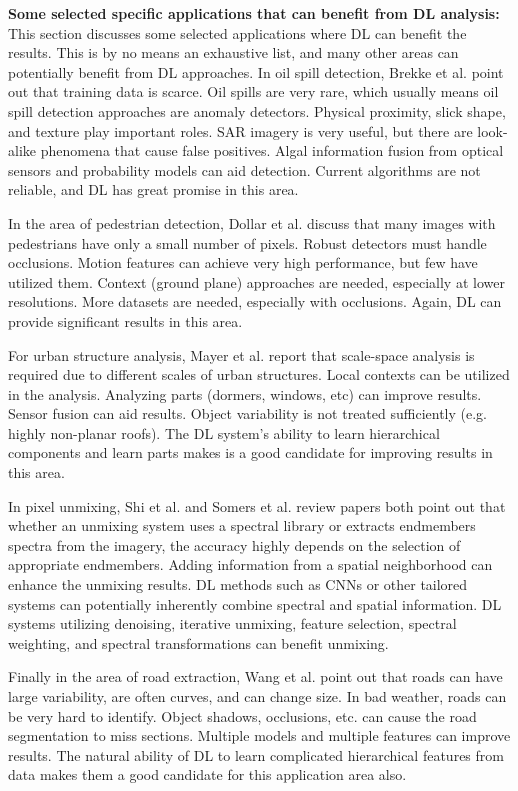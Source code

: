 \documentclass[12pt]{spieman}
\begin{document}
\begin{spacing}{1}
\textbf{Some selected specific applications that can benefit from DL analysis:} This section discusses some selected applications where DL can benefit the results. This is by no means an exhaustive list, and many other areas can potentially benefit from DL approaches. In oil spill detection, Brekke et al. \cite{brekke2005oil} point out that training data is scarce. Oil spills are very rare, which usually means oil spill detection approaches are anomaly detectors. Physical proximity, slick shape, and texture play important roles. SAR imagery is very useful, but there are look-alike phenomena that cause false positives. Algal information fusion from optical sensors and probability models can aid detection. Current algorithms are not reliable, and DL has great promise in this area.

In the area of pedestrian detection, Dollar et al. \cite{dollar2012pedestrian} discuss that many images with pedestrians have only a small number of pixels. Robust detectors must handle occlusions. Motion features can achieve very high performance, but few have utilized them. Context (ground plane) approaches are needed, especially at lower resolutions. More datasets are needed, especially with occlusions. Again, DL can provide significant results in this area.

For urban structure analysis, Mayer et al. \cite{mayer1999automatic} report that scale-space analysis is required due to different scales of urban structures. Local contexts can be utilized in the analysis. Analyzing parts (dormers, windows, etc) can improve results. Sensor fusion can aid results. Object variability is not treated sufficiently (e.g. highly non-planar roofs). The DL system's ability to learn hierarchical components and learn parts makes is a good candidate for improving results in this area.

In pixel unmixing, Shi et al. \cite{shi2014incorporating} and Somers et al. \cite{somers2011endmember} review papers both point out that whether an unmixing system uses a spectral library or extracts endmembers spectra from the imagery, the accuracy highly depends on the selection of appropriate endmembers. Adding information from a spatial neighborhood can enhance the unmixing results. DL methods such as CNNs or other tailored systems can potentially inherently combine spectral and spatial information. DL systems utilizing denoising, iterative unmixing, feature selection, spectral weighting, and spectral transformations can benefit unmixing.

Finally in the area of road extraction, Wang et al. \cite{wang2016review} point out that roads can have large variability, are often curves, and can change size. In bad weather, roads can be very hard to identify. Object shadows, occlusions, etc. can cause the road segmentation to miss sections. Multiple models and multiple features can improve results. The natural ability of DL to learn complicated hierarchical features from data makes them a good candidate for this application area also.



\end{spacing}
\end{document}
